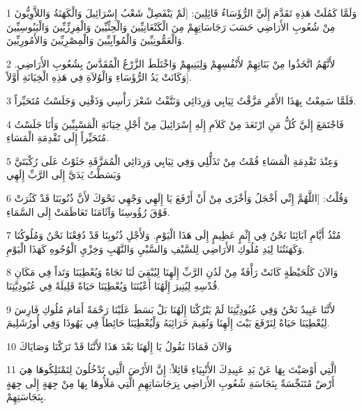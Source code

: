 \par 1 وَلَمَّا كَمُلَتْ هَذِهِ تَقَدَّمَ إِلَيَّ الرُّؤَسَاءُ قَائِلِينَ: [لَمْ يَنْفَصِلْ شَعْبُ إِسْرَائِيلَ وَالْكَهَنَةُ وَاللاَّوِيُّونَ مِنْ شُعُوبِ الأَرَاضِي حَسَبَ رَجَاسَاتِهِمْ مِنَ الْكَنْعَانِيِّينَ وَالْحِثِّيِّينَ وَالْفِرِزِّيِّينَ وَالْيَبُوسِيِّينَ وَالْعَمُّونِيِّينَ وَالْمُوآبِيِّينَ وَالْمِصْرِيِّينَ وَالأَمُورِيِّينَ.
\par 2 لأَنَّهُمُ اتَّخَذُوا مِنْ بَنَاتِهِمْ لأَنْفُسِهِمْ وَلِبَنِيهِمْ وَاخْتَلَطَ الزَّرْعُ الْمُقَدَّسُ بِشُعُوبِ الأَرَاضِي. وَكَانَتْ يَدُ الرُّؤَسَاءِ وَالْوُلاَةِ فِي هَذِهِ الْخِيَانَةِ أَوَّلاً].
\par 3 فَلَمَّا سَمِعْتُ بِهَذَا الأَمْرِ مَزَّقْتُ ثِيَابِي وَرِدَائِي وَنَتَّفْتُ شَعْرَ رَأْسِي وَذَقْنِي وَجَلَسْتُ مُتَحَيِّراً.
\par 4 فَاجْتَمَعَ إِلَيَّ كُلُّ مَنِ ارْتَعَدَ مِنْ كَلاَمِ إِلَهِ إِسْرَائِيلَ مِنْ أَجْلِ خِيَانَةِ الْمَسْبِيِّينَ وَأَنَا جَلَسْتُ مُتَحَيِّراً إِلَى تَقْدِمَةِ الْمَسَاءِ.
\par 5 وَعِنْدَ تَقْدِمَةِ الْمَسَاءِ قُمْتُ مِنْ تَذَلُّلِي وَفِي ثِيَابِي وَرِدَائِي الْمُمَزَّقَةِ جَثَوْتُ عَلَى رُكْبَتَيَّ وَبَسَطْتُ يَدَيَّ إِلَى الرَّبِّ إِلَهِي
\par 6 وَقُلْتُ: [اللَّهُمَّ إِنِّي أَخْجَلُ وَأَخْزَى مِنْ أَنْ أَرْفَعَ يَا إِلَهِي وَجْهِي نَحْوَكَ لأَنَّ ذُنُوبَنَا قَدْ كَثُرَتْ فَوْقَ رُؤُوسِنَا وَآثَامَنَا تَعَاظَمَتْ إِلَى السَّمَاءِ.
\par 7 مُنْذُ أَيَّامِ آبَائِنَا نَحْنُ فِي إِثْمٍ عَظِيمٍ إِلَى هَذَا الْيَوْمِ. وَلأَجْلِ ذُنُوبِنَا قَدْ دُفِعْنَا نَحْنُ وَمُلُوكُنَا وَكَهَنَتُنَا لِيَدِ مُلُوكِ الأَرَاضِي لِلسَّيْفِ وَالسَّبْيِ وَالنَّهْبِ وَخِزْيِ الْوُجُوهِ كَهَذَا الْيَوْمِ.
\par 8 وَالآنَ كَلُحَيْظَةٍ كَانَتْ رَأْفَةٌ مِنْ لَدُنِ الرَّبِّ إِلَهِنَا لِيُبْقِيَ لَنَا نَجَاةً وَيُعْطِيَنَا وَتَداً فِي مَكَانِ قُدْسِهِ لِيُنِيرَ إِلَهُنَا أَعْيُنَنَا وَيُعْطِيَنَا حَيَاةً قَلِيلَةً فِي عُبُودِيَّتِنَا.
\par 9 لأَنَّنَا عَبِيدٌ نَحْنُ وَفِي عُبُودِيَّتِنَا لَمْ يَتْرُكْنَا إِلَهُنَا بَلْ بَسَطَ عَلَيْنَا رَحْمَةً أَمَامَ مُلُوكِ فَارِسَ لِيُعْطِيَنَا حَيَاةً لِنَرْفَعَ بَيْتَ إِلَهِنَا وَنُقِيمَ خَرَائِبَهُ وَلْيُعْطِيَنَا حَائِطاً فِي يَهُوذَا وَفِي أُورُشَلِيمَ.
\par 10 وَالآنَ فَمَاذَا نَقُولُ يَا إِلَهَنَا بَعْدَ هَذَا لأَنَّنَا قَدْ تَرَكْنَا وَصَايَاكَ
\par 11 الَّتِي أَوْصَيْتَ بِهَا عَنْ يَدِ عَبِيدِكَ الأَنْبِيَاءِ قَائِلاً: إِنَّ الأَرْضَ الَّتِي تَدْخُلُونَ لِتَمْتَلِكُوهَا هِيَ أَرْضٌ مُتَنَجِّسَةٌ بِنَجَاسَةِ شُعُوبِ الأَرَاضِي بِرَجَاسَاتِهِمِ الَّتِي مَلَأُوهَا بِهَا مِنْ جِهَةٍ إِلَى جِهَةٍ بِنَجَاسَتِهِمْ.
